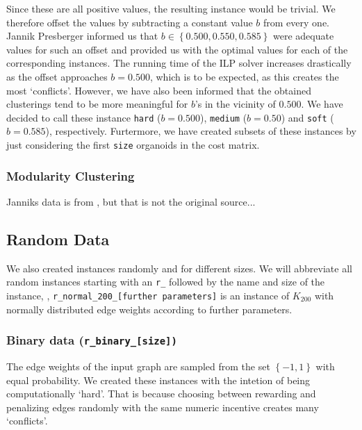 Since these are all positive values, the resulting \CP instance would be trivial.
We therefore offset the values by subtracting a constant value $b$ from every one.
Jannik Presberger informed us that $b \in \left\{ 0.500, 0.550, 0.585 \right\}$ were adequate values for such an offset and provided us with the optimal values for each of the corresponding instances.
The running time of the ILP solver increases drastically as the offset approaches $b = 0.500$, which is to be expected, as this creates the most ‘conflicts’.
However, we have also been informed that the obtained clusterings tend to be more meaningful for $b$’s in the vicinity of $0.500$.
We have decided to call these instance \texttt{hard} ($b= 0.500$), \texttt{medium} ($b = 0.50$) and \texttt{soft} ($b = 0.585$), respectively.
Furtermore, we have created subsets of these instances by just considering the first \texttt{size} organoids in the cost matrix.



\subsubsection{Modularity Clustering}
Janniks data is from \cite{kappesComparativeStudyModern2015a}, but that is not the original source...


\subsection{Random Data}\label{subsec:random_data}
We also created \CP instances randomly and for different sizes.
We will abbreviate all random instances starting with an \texttt{r\_} followed by the name and size of the instance,
\eg, \texttt{r\_normal\_200\_[further parameters]} is an instance of $K_{200}$ with normally distributed edge weights according to further parameters.

\subsubsection{Binary data (\texttt{r\_binary\_[size])}}\label{subsubsec:data_random_binary}
The edge weights of the input graph are sampled from the set $\left\{ -1, 1 \right\}$ with equal probability.
We created these instances with the intetion of being computationally ‘hard’.
That is because choosing between rewarding and penalizing edges randomly with the same numeric incentive creates many ‘conflicts’.

